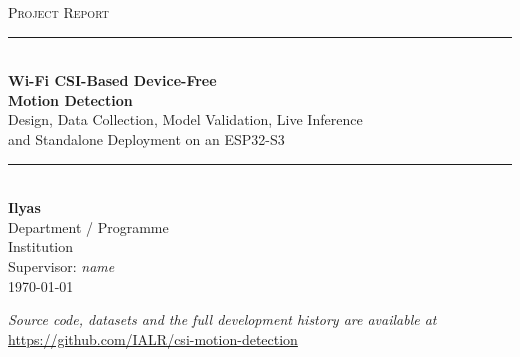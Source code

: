 \documentclass[11pt,a4paper]{article}
\begin{document}

\begin{titlepage}
\centering
\vspace*{2.2cm}

{\Large\scshape Project Report}\\[0.4cm]
\rule{\linewidth}{0.4pt}\\[0.7cm]

{\huge\bfseries Wi-Fi CSI-Based Device-Free\\[0.25cm] Motion Detection}\\[0.7cm]

{\large Design, Data Collection, Model Validation, Live Inference\\
and Standalone Deployment on an ESP32-S3}\\[0.5cm]

\rule{\linewidth}{0.4pt}\\[1.6cm]

{\large\textbf{Ilyas}}\\[0.3cm]
{\normalsize Department / Programme}\\[0.15cm]
{\normalsize Institution}\\[0.15cm]
{\normalsize Supervisor: \textit{name}}\\[1.6cm]

{\large \today}\\[2.0cm]

\begin{minipage}{0.86\linewidth}\small
\textit{Source code, datasets and the full development history are available at}\\
\url{https://github.com/IALR/csi-motion-detection}
\end{minipage}

\vfill
\end{titlepage}
\end{document}
